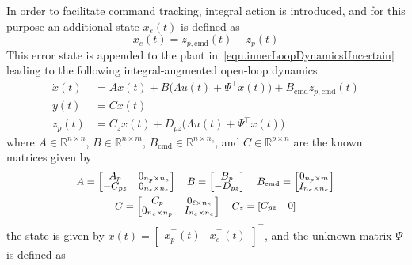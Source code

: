 \documentclass[journal]{IEEEtran}
\theoremstyle{innercustomthm}
\begin{document}
  In order to facilitate command tracking, integral action is introduced, and for this purpose an additional state $x_{e}(t)$ is defined as
  \begin{equation}
    \label{eqn.xedot}
    \dot{x}_{e}(t) = z_{p,\text{cmd}}(t) - z_{p}(t)
  \end{equation}
  This error state is appended to the plant in\ \eqref{eqn.innerLoopDynamicsUncertain} leading to the following integral-augmented open-loop dynamics
  {%
    \small
    \begin{align}
      \label{eqn.uncsystem}
      \dot{x}(t) &= Ax(t)+B\bigr(\Lambda u(t)+\Psi^{\top}x(t)\bigr)+B_{\text{cmd}}z_{p,\text{cmd}}(t) \nonumber \\
      y(t) &= Cx(t) \\
      z_{p}(t) &= C_{z}x(t) + D_{pz}\bigr(\Lambda u(t)+\Psi^{\top}x(t)\bigr) \nonumber
    \end{align}
  }%
  where $A\in\mathbb{R}^{n\times n}$, $B\in\mathbb{R}^{n\times m}$, $B_{\text{cmd}}\in\mathbb{R}^{n\times n_{e}}$, and $C\in\mathbb{R}^{p\times n}$ are the known matrices given by
  \begin{equation*}
    \fontsize{9pt}{9pt}\selectfont
    \begin{gathered}
      A=
      \begin{bmatrix}
        A_{p} & 0_{n_{p}\times n_{e}} \\
        -C_{pz} & 0_{n_{e}\times n_{e}}
      \end{bmatrix} \quad
      B=
      \begin{bmatrix}
        B_{p} \\
        -D_{pz}
      \end{bmatrix}
      \quad
      B_{\text{cmd}}=
      \begin{bmatrix}
        0_{n_{p}\times m} \\
        I_{n_{e}\times n_{e}}
      \end{bmatrix} \\
      C=
      \begin{bmatrix}
        C_{p} & 0_{\ell\times n_{e}} \\
        0_{n_{e}\times n_{p}} & I_{n_{e}\times n_{e}}
      \end{bmatrix}
      \quad
      C_{z} =
      \begin{bmatrix}
        C_{pz} & 0
      \end{bmatrix}
    \end{gathered}
  \end{equation*}
  the state is given by $x(t)= \begin{bmatrix} x_{p}^{\top}(t) & x_{e}^{\top}(t)\end{bmatrix}^{\top}$, and the unknown matrix $\Psi$ is defined as
\end{document}

